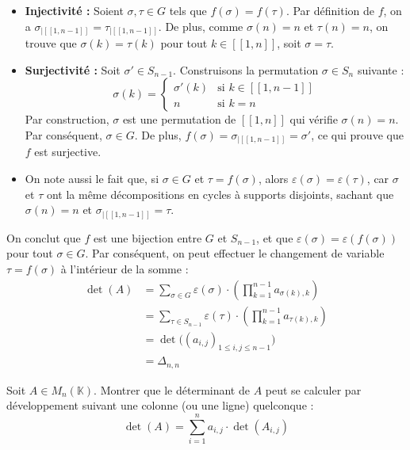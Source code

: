 \documentclass[11pt, a4paper]{article}
\theoremstyle{definition}
\begin{document}
\begin{itemize}
	\item \textbf{Injectivité :} Soient $\sigma, \tau \in G$ tels que $f(\sigma) = f(\tau)$. Par définition de $f$, on a $\sigma_{|[\![1,n-1]\!]} = \tau_{|[\![1,n-1]\!]}$. De plus, comme $\sigma(n) = n$ et $\tau(n) = n$, on trouve que $\sigma(k) = \tau(k)$ pour tout $k \in [\![1,n]\!]$, soit $\sigma = \tau$.
	\item \textbf{Surjectivité :} Soit $\sigma' \in S_{n-1}$. Construisons la permutation $\sigma \in S_n$ suivante :
	$$\sigma(k) = \begin{cases} \sigma'(k) & \text{si } k \in [\![1,n-1]\!] \\ n & \text{si } k = n \end{cases}$$
	Par construction, $\sigma$ est une permutation de $[\![1,n]\!]$ qui vérifie $\sigma(n) = n$. Par conséquent, $\sigma \in G$. De plus, $f(\sigma) = \sigma_{|[\![1,n-1]\!]} = \sigma'$, ce qui prouve que $f$ est surjective.
	\item On note aussi le fait que, si $\sigma \in G$ et $\tau = f(\sigma)$, alors $\varepsilon(\sigma) = \varepsilon(\tau)$, car $\sigma$ et $\tau$ ont la même décompositions en cycles à supports disjoints, sachant que $\sigma(n) = n$ et $\sigma_{|[\![1,n-1]\!]} = \tau$.
\end{itemize}

On conclut que $f$ est une bijection entre $G$ et $S_{n-1}$, et que $\varepsilon(\sigma) = \varepsilon(f(\sigma))$ pour tout $\sigma \in G$. Par conséquent, on peut effectuer le changement de variable $\tau = f(\sigma)$ à l'intérieur de la somme :
\begin{align*}
	\det(A) &= \sum_{\sigma \in G} \varepsilon(\sigma) \cdot \left(\prod_{k=1}^{n-1} a_{\sigma(k), k}\right) \\
	&= \sum_{\tau \in S_{n-1}} \varepsilon(\tau) \cdot \left(\prod_{k=1}^{n-1} a_{\tau(k), k}\right) \\
	&= \det\bigl((a_{i,j})_{1 \le i,j \le n-1}\bigr) \\
	&= \Delta_{n,n}
\end{align*}

\clearpage

\begin{tcolorbox}[instructionstyle]
	Soit $A \in M_n(\mathbb{K})$. Montrer que le déterminant de $A$ peut se calculer par développement suivant une colonne (ou une ligne) quelconque :
	$$\det(A) = \sum_{i=1}^{n} a_{i,j} \cdot \det(A_{i,j})$$
\end{tcolorbox}
\end{document}
